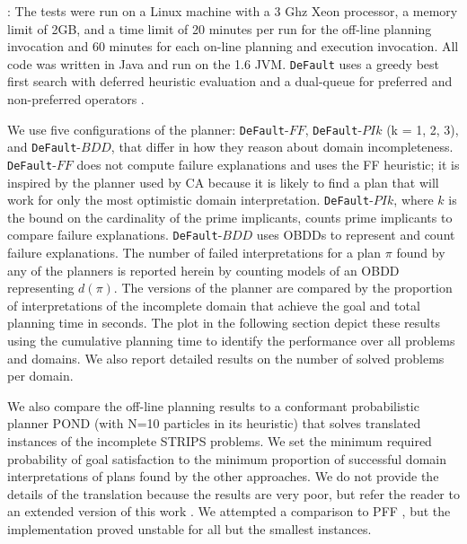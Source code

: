 \documentclass[letterpaper]{article}
\def\und#1{\noindent{\bf #1}:}
\def\default{{\tt DeFault}}
\def\citep#1{\cite{#1}}
\begin{document}
\und{Test Setup} The tests were run on a Linux machine with a 3 Ghz Xeon
processor, a memory limit of 2GB, and a time limit of 20 minutes per run for the
off-line planning invocation and 60 minutes for each on-line planning and
execution invocation.  All code was written in Java and run on the 1.6 JVM. 
\default{} uses a greedy best first search with deferred heuristic evaluation
and a dual-queue for preferred and non-preferred operators
\citep{DBLP:journals/jair/Helmert06}.  

We use five configurations of the planner: \default{}-$FF$, \default{}-$PIk$ (k
= 1, 2, 3), and \default{}-$BDD$, that differ in how they reason about domain
incompleteness.  \default{}-$FF$ does not compute failure explanations and uses
the FF heuristic;  it is inspired by the planner used by CA because it is likely
to find a plan that will work for only the most optimistic domain
interpretation.  \default{}-$PIk$, where $k$ is the bound on the cardinality of
the prime implicants, counts prime implicants to compare failure
explanations.  \default{}-$BDD$ uses OBDDs to represent and count failure
explanations.  The number of failed interpretations for a plan $\pi$ found by
any of the planners is reported herein by counting models of an OBDD
representing $d(\pi)$. The versions of the planner are compared by the
proportion of interpretations of the incomplete domain that achieve the goal and
total planning time in seconds. The plot in the following section depict these
results using the cumulative
planning time to identify the performance over all problems and domains.  We
also report detailed results on the number of solved problems per domain.

We also compare the off-line planning results to a conformant probabilistic
planner POND (with N=10 particles in its heuristic) \citep{aij-mclug} that solves
translated instances of the incomplete STRIPS problems.  We set the minimum
required probability of goal satisfaction to the minimum proportion of
successful domain interpretations of plans found by the other approaches. We do
not provide the details of the translation because the results are very poor,
but refer the reader to an extended version of this work
\citep{USU-CS-TR-11-001}.  We attempted a comparison to PFF \citep{pff}, but the
implementation proved unstable for all but the smallest instances.
\end{document}
